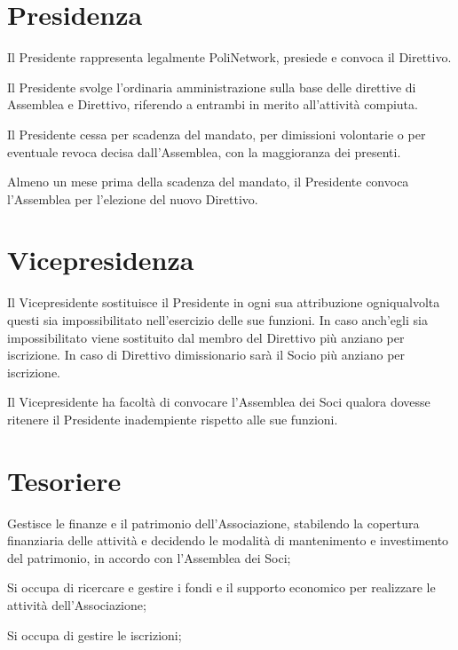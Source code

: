 \documentclass[legalpaper, 11pt]{exam}
\let\tempone\enumerate
\let\temptwo\endenumerate
\renewenvironment{enumerate}{\tempone\addtolength{\itemsep}{-0.45\baselineskip}}{\temptwo}
\begin{document}
{\section{Presidenza}
\begin{enumerate}
 \item Il Presidente rappresenta legalmente PoliNetwork, presiede e convoca il Direttivo.
 \item Il Presidente svolge l’ordinaria amministrazione sulla base delle direttive di Assemblea e Direttivo, riferendo a entrambi in merito all’attività compiuta.
 \item Il Presidente cessa per scadenza del mandato, per dimissioni volontarie o per eventuale revoca decisa dall’Assemblea, con la maggioranza dei presenti.
 \item Almeno un mese prima della scadenza del mandato, il Presidente convoca l’Assemblea per l’elezione del nuovo Direttivo.
\end{enumerate}

\section{Vicepresidenza}
\begin{enumerate}
 \item Il Vicepresidente sostituisce il Presidente in ogni sua attribuzione ogniqualvolta questi sia impossibilitato nell’esercizio delle sue funzioni. In caso anch'egli sia impossibilitato viene sostituito dal membro del Direttivo più anziano per iscrizione. In caso di Direttivo dimissionario sarà il Socio più anziano per iscrizione.
 \item Il Vicepresidente ha facoltà di convocare l’Assemblea dei Soci qualora dovesse ritenere il Presidente inadempiente rispetto alle sue funzioni.
\end{enumerate}

\section{Tesoriere}
\begin{enumerate}
 \item Gestisce le finanze e il patrimonio dell’Associazione, stabilendo la copertura finanziaria delle attività e decidendo le modalità di mantenimento e investimento del patrimonio, in accordo con l’Assemblea dei Soci;
 \item Si occupa di ricercare e gestire i fondi e il supporto economico per realizzare le attività dell’Associazione;
 \item Si occupa di gestire le iscrizioni;
\end{enumerate}

}
\end{document}
